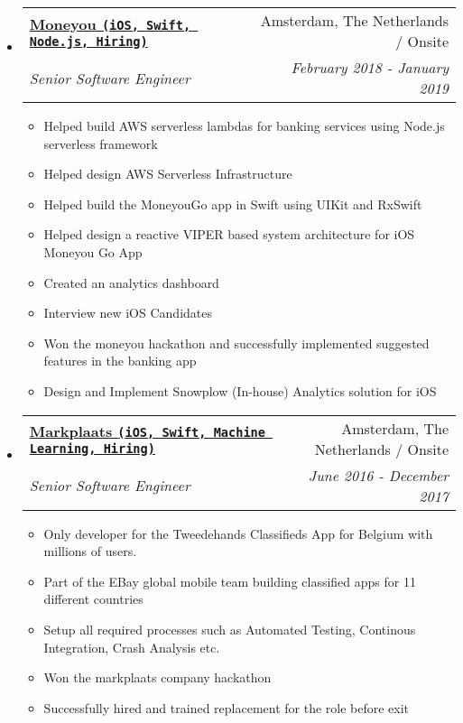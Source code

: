 \documentclass[letterpaper,11pt]{article}
\makeatletter
\newcommand{\resitem}[1]{\item #1 \vspace{-2pt}}
\newcommand{\ressubheading}[4]{
\begin{tabular*}{7.0in}{l@{\extracolsep{\fill}}r}
    \textbf{#1} & #2 \\
    \textit{#3} & \textit{#4} \\
\end{tabular*}\vspace{-6pt}}
\makeatother
\begin{document}
\begin{itemize}
    
\item
    \ressubheading{\href{https://www.moneyou.nl/}{Moneyou \texttt{(iOS, Swift, Node.js, Hiring)}}}{Amsterdam, The Netherlands / Onsite}{Senior Software Engineer}{February 2018 - January 2019}
    \begin{itemize}
        \resitem{Helped build AWS serverless lambdas for banking services using Node.js serverless framework}
        \resitem{Helped design AWS Serverless Infrastructure}
        \resitem{Helped build the MoneyouGo app in Swift using UIKit and RxSwift}
        \resitem{Helped design a reactive VIPER based system architecture for iOS Moneyou Go App}
        \resitem{Created an analytics dashboard}
        \resitem{Interview new iOS Candidates}
        \resitem{Won the moneyou hackathon and successfully implemented suggested features in the banking app}
        \resitem{Design and Implement Snowplow (In-house) Analytics solution for iOS}
    \end{itemize}

\vspace{0.1in}
    
\item
    \ressubheading{\href{https://www.markplaats.nl/}{Markplaats \texttt{(iOS, Swift, Machine Learning, Hiring)}}}{Amsterdam, The Netherlands / Onsite}{Senior Software Engineer}{June 2016 - December 2017}
    \begin{itemize}
        \resitem{Only developer for the Tweedehands Classifieds App for Belgium with millions of users.}
        \resitem{Part of the EBay global mobile team building classified apps for 11 different countries}
        \resitem{Setup all required processes such as Automated Testing, Continous Integration, Crash Analysis etc.}
        \resitem{Won the markplaats company hackathon}
        \resitem{Successfully hired and trained replacement for the role before exit}
    \end{itemize}


\end{itemize}

\vspace{0.3in}
\end{document}
